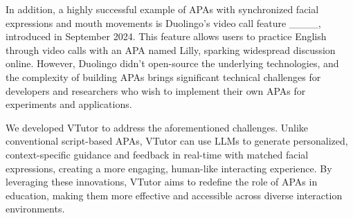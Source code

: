 In addition, a highly successful example of APAs with synchronized facial expressions and mouth movements is Duolingo’s video call feature ____, introduced in September 2024. This feature allows users to practice English through video calls with an APA named Lilly, sparking widespread discussion online. However, Duolingo didn't open-source the underlying technologies, and the complexity of building APAs brings significant technical challenges for developers and researchers who wish to implement their own APAs for experiments and applications.

We developed VTutor to address the aforementioned challenges. Unlike conventional script-based APAs, VTutor can use LLMs to generate personalized, context-specific guidance and feedback in real-time with matched facial expressions, creating a more engaging, human-like interacting experience. By leveraging these innovations, VTutor aims to redefine the role of APAs in education, making them more effective and accessible across diverse interaction environments.